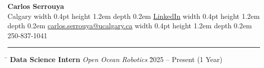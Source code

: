 \documentclass[a4paper,11pt]{article}
\def\locationh{\hspace{7cm}}
\def\titlev{\vspace{.5cm}}
\def\sectionv{\vspace{.2cm}}
\begin{document}
\begin{center}
    {\LARGE \textbf{Carlos Serrouya}}\\[0.3cm]
    Calgary \hspace{0.5em} 
    \vrule width 0.4pt height 1.2em depth 0.2em \hspace{0.5em}
    \href{https://www.linkedin.com/in/carlos-serrouya-27053b276}{LinkedIn} \hspace{0.5em} 
    \vrule width 0.4pt height 1.2em depth 0.2em \hspace{0.5em}
    \href{mailto:carlos.serrouya@ucalgary.ca}{carlos.serrouya@ucalgary.ca} \hspace{0.5em} 
    \vrule width 0.4pt height 1.2em depth 0.2em \hspace{0.5em}
    250-837-1041
\end{center}
\titlev

\noindent {}
\vspace{-2.35em} %
\par\noindent
\rule{\textwidth}{0.4pt}

\sectionv

\noindent \begin{tabbing}
    \locationh \= \kill
    \textbf{Data Science Intern} \textit{Open Ocean Robotics} \` 2025 – Present (1 Year) \\
\end{tabbing}
\end{document}
